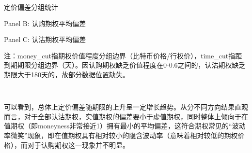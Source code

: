 \begin{center}
\begin{threeparttable}[HT]
\centering
\caption{定价偏差分组统计}
\label{tab:option_bias_group}
\begin{small}


\bigskip

\caption*{Panel B: 认购期权平均偏差}
\bigskip

\caption*{Panel C: 认沽期权平均偏差}
\begin{tablenotes}
    \footnotesize
    \item 注：money\_cut指期权价值程度分组边界（比特币价格/行权价），time\_cut指距到期期限分组边界（天）。因认购期权缺乏价值程度在0-0.6之间的，认沽期权缺乏期限大于180天的，故部分数据位置缺失。
\end{tablenotes}
        \end{small}
    \end{threeparttable}
        
\end{center}
~\\
\par{可以看到，总体上定价偏差随期限的上升呈一定增长趋势。从分不同方向结果直观而言，对于全部认沽期权，实值期权的偏差要小于虚值期权，同时整体上倾向于在值期权（即moneyness非常接近1）拥有最小的平均偏差，这符合期权常见的“波动率微笑”现象，即在值期权具有相对较小的隐含波动率（意味着相对较低的期权价格），而对于认购期权这一现象并不明显。}
